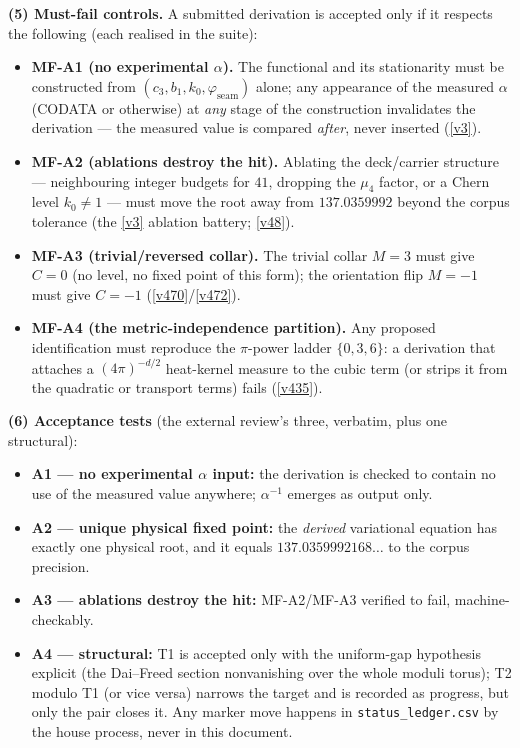 \documentclass[11pt,a4paper]{article}
\newcommand{\cthree}{c_3}
\begin{document}
\par\smallskip\noindent\textbf{(5) Must-fail controls.} A submitted derivation is accepted only
if it respects the following (each realised in the suite):
\begin{itemize}
\item \textbf{MF-A1 (no experimental $\alpha$).} The functional and its stationarity must be
  constructed from $(\cthree, b_1, k_0, \varphi_{\mathrm{seam}})$ alone; any appearance of the
  measured $\alpha$ (CODATA or otherwise) at \emph{any} stage of the construction invalidates
  the derivation --- the measured value is compared \emph{after}, never inserted
  (\vref{v3}).
\item \textbf{MF-A2 (ablations destroy the hit).} Ablating the deck/carrier structure ---
  neighbouring integer budgets for $41$, dropping the $\mu_4$ factor, or a Chern level
  $k_0\neq1$ --- must move the root away from $137.0359992$ beyond the corpus tolerance
  (the \vref{v3} ablation battery; \vref{v48}).
\item \textbf{MF-A3 (trivial/reversed collar).} The trivial collar $M=3$ must give $C=0$ (no
  level, no fixed point of this form); the orientation flip $M=-1$ must give $C=-1$
  (\vref{v470}/\vref{v472}).
\item \textbf{MF-A4 (the metric-independence partition).} Any proposed identification must
  reproduce the $\pi$-power ladder $\{0,3,6\}$: a derivation that attaches a
  $(4\pi)^{-d/2}$ heat-kernel measure to the cubic term (or strips it from the quadratic or
  transport terms) fails (\vref{v435}).
\end{itemize}

\par\smallskip\noindent\textbf{(6) Acceptance tests} (the external review's three, verbatim, plus
one structural):
\begin{itemize}
\item \textbf{A1 --- no experimental $\alpha$ input:} the derivation is checked to contain no
  use of the measured value anywhere; $\alpha^{-1}$ emerges as output only.
\item \textbf{A2 --- unique physical fixed point:} the \emph{derived} variational equation has
  exactly one physical root, and it equals $137.0359992168\ldots$ to the corpus precision.
\item \textbf{A3 --- ablations destroy the hit:} MF-A2/MF-A3 verified to fail, machine-checkably.
\item \textbf{A4 --- structural:} T1 is accepted only with the uniform-gap hypothesis explicit
  (the Dai--Freed section nonvanishing over the whole moduli torus); T2 modulo T1 (or vice
  versa) narrows the target and is recorded as progress, but only the pair closes it. Any
  marker move happens in \texttt{status\_ledger.csv} by the house process, never in this
  document.
\end{itemize}
\end{document}
